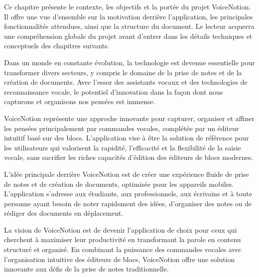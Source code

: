 

\noindent
Ce chapitre présente le contexte, les objectifs et la portée du projet VoiceNotion. Il offre une vue d'ensemble sur la motivation derrière l'application, les principales fonctionnalités attendues, ainsi que la structure du document. Le lecteur acquerra une compréhension globale du projet avant d'entrer dans les détails techniques et conceptuels des chapitres suivants.

\thispagestyle{fancy}

\vspace{1cm}

Dans un monde en constante évolution, la technologie est devenue essentielle pour transformer divers secteurs, y compris le domaine de la prise de notes et de la création de documents. Avec l'essor des assistants vocaux et des technologies de reconnaissance vocale, le potentiel d'innovation dans la façon dont nous capturons et organisons nos pensées est immense.

VoiceNotion représente une approche innovante pour capturer, organiser et affiner les pensées principalement par commandes vocales, complétée par un éditeur intuitif basé sur des blocs. L'application vise à être la solution de référence pour les utilisateurs qui valorisent la rapidité, l'efficacité et la flexibilité de la saisie vocale, sans sacrifier les riches capacités d'édition des éditeurs de blocs modernes.

\vspace{0.5cm}

L'idée principale derrière VoiceNotion est de créer une expérience fluide de prise de notes et de création de documents, optimisée pour les appareils mobiles. L'application s'adresse aux étudiants, aux professionnels, aux écrivains et à toute personne ayant besoin de noter rapidement des idées, d'organiser des notes ou de rédiger des documents en déplacement.

\vspace{0.5cm}

La vision de VoiceNotion est de devenir l'application de choix pour ceux qui cherchent à maximiser leur productivité en transformant la parole en contenu structuré et organisé. En combinant la puissance des commandes vocales avec l'organisation intuitive des éditeurs de blocs, VoiceNotion offre une solution innovante aux défis de la prise de notes traditionnelle.

\vspace{1cm}


